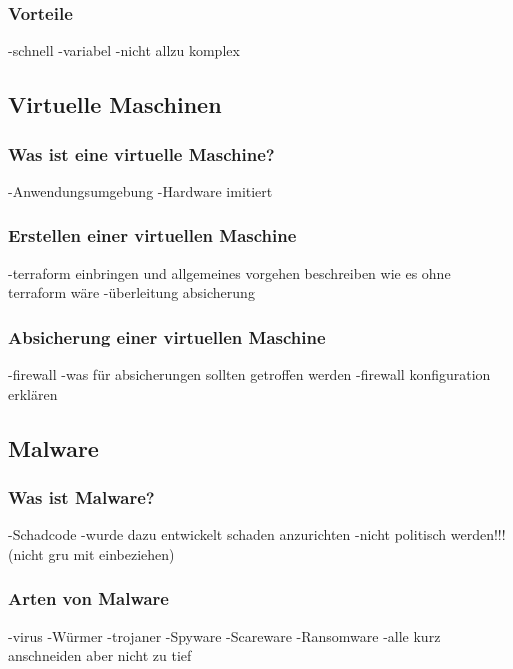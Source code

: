 \documentclass[12pt,oneside]{article}
\begin{document}
\subsubsection{Vorteile}
-schnell
\newline
-variabel
\newline
-nicht allzu komplex
\subsection{Virtuelle Maschinen}
\subsubsection{Was ist eine virtuelle Maschine?}
-Anwendungsumgebung
\newline
-Hardware imitiert

\subsubsection{Erstellen einer virtuellen Maschine}
-terraform einbringen und allgemeines vorgehen beschreiben wie es ohne terraform wäre
\newline
-überleitung absicherung
\subsubsection{Absicherung einer virtuellen Maschine}
-firewall 
\newline
-was für absicherungen sollten getroffen werden
\newline
-firewall konfiguration erklären
\subsection{Malware}
\subsubsection{Was ist Malware?}
-Schadcode 
\newline
-wurde dazu entwickelt schaden anzurichten
\newline
-nicht politisch werden!!! (nicht gru mit einbeziehen)
\subsubsection{Arten von Malware}
-virus
\newline
-Würmer
\newline
-trojaner
\newline
-Spyware
\newline
-Scareware
\newline
-Ransomware
\newline
-alle kurz anschneiden aber nicht zu tief
\end{document}
